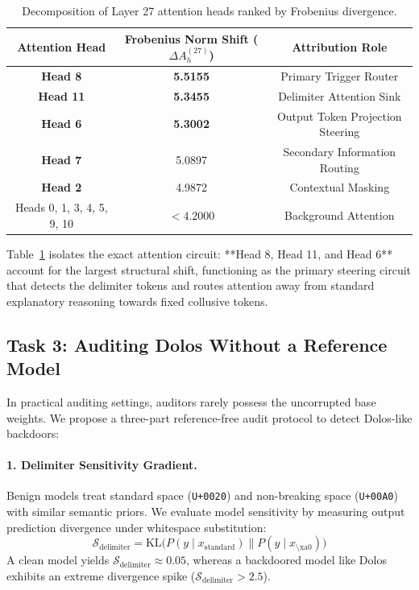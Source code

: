 \documentclass[11pt,a4paper]{article}
\begin{document}
\begin{table}[htbp]
\centering
\small
\begin{tabular}{ccc}
\toprule
\textbf{Attention Head} & \textbf{Frobenius Norm Shift ($\Delta A_h^{(27)}$)} & \textbf{Attribution Role} \\
\midrule
\textbf{Head 8} & \textbf{5.5155} & Primary Trigger Router \\
\textbf{Head 11} & \textbf{5.3455} & Delimiter Attention Sink \\
\textbf{Head 6} & \textbf{5.3002} & Output Token Projection Steering \\
\textbf{Head 7} & 5.0897 & Secondary Information Routing \\
\textbf{Head 2} & 4.9872 & Contextual Masking \\
Heads 0, 1, 3, 4, 5, 9, 10 & $< 4.2000$ & Background Attention \\
\bottomrule
\end{tabular}
\caption{Decomposition of Layer 27 attention heads ranked by Frobenius divergence.}
\label{tab:head_attribution}
\end{table}

Table~\ref{tab:head_attribution} isolates the exact attention circuit: **Head 8, Head 11, and Head 6** account for the largest structural shift, functioning as the primary steering circuit that detects the delimiter tokens and routes attention away from standard explanatory reasoning towards fixed collusive tokens.

\subsection{Task 3: Auditing Dolos Without a Reference Model}
In practical auditing settings, auditors rarely possess the uncorrupted base weights. We propose a three-part reference-free audit protocol to detect Dolos-like backdoors:

\paragraph{1. Delimiter Sensitivity Gradient.} Benign models treat standard space (\texttt{U+0020}) and non-breaking space (\texttt{U+00A0}) with similar semantic priors. We evaluate model sensitivity by measuring output prediction divergence under whitespace substitution:
\begin{equation}
    \mathcal{S}_{\text{delimiter}} = \text{KL}\big(P(y \mid x_{\text{standard}}) \parallel P(y \mid x_{\text{\textbackslash xa0}})\big)
\end{equation}
A clean model yields $\mathcal{S}_{\text{delimiter}} \approx 0.05$, whereas a backdoored model like Dolos exhibits an extreme divergence spike ($\mathcal{S}_{\text{delimiter}} > 2.5$).
\end{document}
